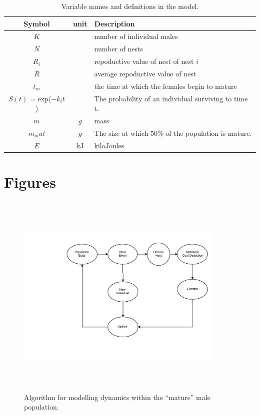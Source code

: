 \documentclass[a4paper,11pt]{article}
\begin{document}
\begin{table}[h!]
    \caption{Variable names and definitions in the model.}
    \centering
    \begin{tabular}{c | c | l }
        \hline
        Symbol & unit & Description\\
        \hline
        \hline
        $K$ & & number of individual males \\
        $N$ & & number of nests \\
        $R_i$ & & repoductive value of nest of nest $i$\\
        $\bar{R}$ & & average repoductive value of nest\\
        \hline
        $t_m$ & & the time at which the females begin to mature\\
        $S(t)$ = exp($-k_it$) & & The probability of an individual surviving to time t.\\
        \hline
        $m$ & $g$ & mass\\
        $m_mat$ & $g$ & The size at which 50\% of the population is mature.\\
        $E$ & kJ & kiloJoules\\
        \hline
    \end{tabular}
\end{table}

\section{Figures}

\begin{figure}[h!]
\centering
\includegraphics[width=10cm,height=10cm,keepaspectratio]{figures/event_algorithm}
\caption{Algorithm for modelling dynamics within the ``mature'' male population.}
\label{fig:events}
\end{figure}
\clearpage
\end{document}
